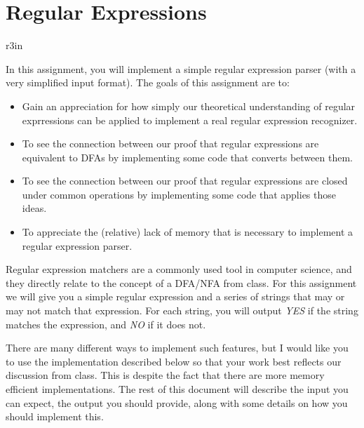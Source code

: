 \documentclass[11pt]{article}
\begin{document}
\section*{Regular Expressions}


\begin{wrapfigure}{r}{3in}
\vspace{-10pt}
\vspace{-30pt}
\end{wrapfigure}

In this assignment, you will implement a simple regular expression parser (with a very simplified input format). The goals of this assignment are to:

\begin{itemize}
	\item Gain an appreciation for how simply our theoretical understanding of regular exprressions can be applied to implement a real regular expression recognizer.
	\item To see the connection between our proof that regular expressions are equivalent to DFAs by implementing some code that converts between them.
	\item To see the connection between our proof that regular expressions are closed under common operations by implementing some code that applies those ideas.
	\item To appreciate the (relative) lack of memory that is necessary to implement a regular expression parser.
\end{itemize}

Regular expression matchers are a commonly used tool in computer science, and they directly relate to the concept of a DFA/NFA from class. For this assignment we will give you a simple regular expression and a series of strings that may or may not match that expression. For each string, you will output \emph{YES} if the string matches the expression, and \emph{NO} if it does not.

There are many different ways to implement such features, but I would like you to use the implementation described below so that your work best reflects our discussion from class. This is despite the fact that there are more memory efficient implementations. The rest of this document will describe the input you can expect, the output you should provide, along with some details on how you should implement this.
\end{document}
